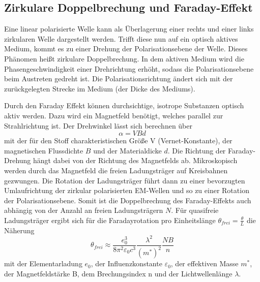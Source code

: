 \subsection{Zirkulare Doppelbrechung und Faraday-Effekt}
Eine linear polarisierte Welle kann als Überlagerung einer rechts und einer links zirkularen Welle dargestellt werden. Trifft diese nun auf ein
optisch aktives Medium, kommt es zu einer Drehung der Polarisationsebene der Welle. Dieses Phänomen heißt zirkulare Doppelbrechung. 
In dem aktiven Medium wird die Phasengeschwindigkeit einer Drehrichtung erhöht, sodass die Polarisationsebene beim Austreten gedreht ist.
Die Polarisationsrichtung ändert sich mit der zurückgelegten Strecke im Medium (der Dicke des Mediums).

Durch den Faraday Effekt können durchsichtige, isotrope Substanzen optisch aktiv werden. Dazu wird ein Magnetfeld benötigt, welches parallel zur
Strahlrichtung ist. Der Drehwinkel lässt sich berechnen über
\begin{equation}
    \alpha = VBd
\end{equation}
mit der für den Stoff charakteristischen Größe V (Vernet-Konstante), der magnetischen Flussdichte $B$ und der Materialdicke $d$.
Die Richtung der Faraday-Drehung hängt dabei von der Richtung des Magnetfelds ab.
Mikroskopisch werden durch das Magnetfeld die freien Ladungsträger auf Kreisbahnen gezwungen. Die Rotation der Ladungsträger
führt dann zu einer bevorzugten Umlaufrichtung der zirkular polarisierten EM-Wellen und so zu einer Rotation der Polarisationsebene.
Somit ist die Doppelbrechung des Faraday-Effekts 
auch abhängig von der Anzahl an freien Ladungsträgern $N$.
Für quasifreie Ladungsträger ergibt sich für die Faradayrotation pro Einheitslänge $\theta_{frei} = \frac{\theta}{L}$ die Näherung
\begin{equation}
    \theta_{frei} \approx \frac{e_0^3}{8 \pi^2 \varepsilon_0 c^3} \frac{\lambda^2}{(m^*)^2}\frac{N B}{n}
    \label{eqn:theta}
\end{equation}
mit der Elementarladung $e_0$, der Influenzkonstante $\varepsilon_0$, der effektiven Masse $m^*$, der Magnetfeldstärke B, dem Brechungsindex n und der Lichtwellenlänge $\lambda$.





